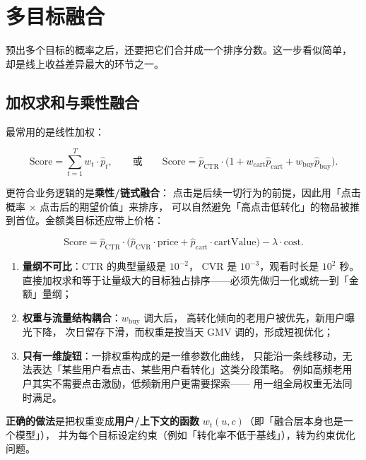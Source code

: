 \section{多目标融合}

预出多个目标的概率之后，还要把它们合并成一个排序分数。这一步看似简单，
却是线上收益差异最大的环节之一。

\subsection{加权求和与乘性融合}

最常用的是线性加权：

\begin{equation}
\mathrm{Score} = \sum_{t=1}^{T} w_t \cdot \hat{p}_t ,
\qquad \text{或} \qquad
\mathrm{Score} = \hat{p}_{\mathrm{CTR}} \cdot \big( 1 + w_{\mathrm{cart}} \hat{p}_{\mathrm{cart}} + w_{\mathrm{buy}} \hat{p}_{\mathrm{buy}} \big).
\label{eq:fusion-linear}
\end{equation}

更符合业务逻辑的是\textbf{乘性/链式融合}：
点击是后续一切行为的前提，因此用「点击概率 $\times$ 点击后的期望价值」来排序，
可以自然避免「高点击低转化」的物品被推到首位。金额类目标还应带上价格：

\begin{equation}
\mathrm{Score} = \hat{p}_{\mathrm{CTR}} \cdot \Big( \hat{p}_{\mathrm{CVR}} \cdot \text{price}
+ \hat{p}_{\mathrm{cart}} \cdot \text{cartValue} \Big) - \lambda \cdot \text{cost} .
\label{eq:fusion-mult}
\end{equation}

\begin{pitfall}[手工权重调参的三个具体问题]
\begin{enumerate}
  \item \textbf{量纲不可比}：CTR 的典型量级是 $10^{-2}$，
        CVR 是 $10^{-3}$，观看时长是 $10^{2}$ 秒。
        直接加权求和等于让量级大的目标独占排序——必须先做归一化或统一到「金额」量纲；
  \item \textbf{权重与流量结构耦合}：$w_{\mathrm{buy}}$ 调大后，
        高转化倾向的老用户被优先，新用户曝光下降，
        次日留存下滑，而权重是按当天 GMV 调的，形成短视优化；
  \item \textbf{只有一维旋钮}：一排权重构成的是一维参数化曲线，
        只能沿一条线移动，无法表达「某些用户看点击、某些用户看转化」这类分段策略。
        例如高频老用户其实不需要点击激励，低频新用户更需要探索——
        用一组全局权重无法同时满足。
\end{enumerate}
\textbf{正确的做法}是把权重变成\textbf{用户/上下文的函数} $w_t(u, c)$（即「融合层本身也是一个模型」），
并为每个目标设定约束（例如「转化率不低于基线」），转为约束优化问题。
\end{pitfall}


